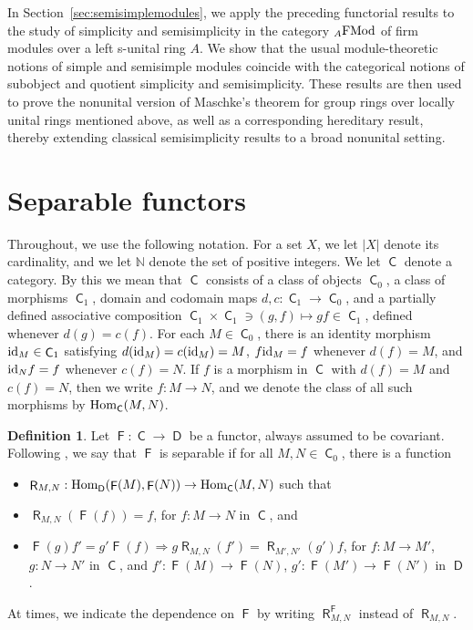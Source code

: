 \documentclass[12pt]{amsart}
\theoremstyle{definition}
\newtheorem{defi}[thm]{Definition}
\newcommand{\N}{\mathbb{N}}
\newcommand{\FMod}{{\rm FMod}}
\newcommand{\id}{{\rm id}}
\newcommand{\Hom}{{\rm Hom}}
\DeclareMathOperator{\C}{\mathsf C}
\DeclareMathOperator{\D}{\mathsf D}
\DeclareMathOperator{\F}{\mathsf F}
\DeclareMathOperator{\R}{\mathsf R}
\begin{document}
In Section~\ref{sec:semisimplemodules}, we apply the preceding functorial results to the study of simplicity and semisimplicity in the category ${}_A\FMod$ of firm modules over a left s-unital ring $A$. We show that the usual module-theoretic notions of simple and semisimple modules coincide with the categorical notions of subobject and quotient simplicity and semisimplicity. These results are then used to prove the nonunital version of Maschke’s theorem for group rings over locally unital rings mentioned above, as well as a corresponding hereditary result, thereby extending classical semisimplicity results to a broad nonunital setting.



\section{Separable functors}\label{sec:separablefunctors}



Throughout, we use the following notation. For a set $X$, we let $|X|$ denote its cardinality, and we let $\N$ denote the set of positive integers.
We let $\C$ denote a category. By this we mean that $\C$ consists of a class of objects $\C_0$, a class of morphisms $\C_1$, domain and codomain maps 
$d,c : \C_1 \to \C_0$, and a partially defined associative composition
$\C_1 \times \C_1 \ni (g,f) \mapsto gf \in \C_1$,
defined whenever $d(g)=c(f)$. For each $M \in \C_0$, there is an identity morphism $\id_M \in \C_1$ satisfying $d(\id_M)=c(\id_M)=M$, 
$f\id_M=f$ whenever $d(f)=M$, and 
$\id_N f=f$ whenever $c(f)=N$.
If $f$ is a morphism in $\C$ with $d(f)=M$ and $c(f)=N$, 
then we write $f:M\to N$, and we denote the class of all such morphisms by $\Hom_{\C}(M,N)$.

\begin{defi}\label{def:separablefunctor}
Let $\F : \C \to \D$ be a functor, 
always assumed to be covariant.
Following \cite{nastasescu1989}, 
we say that 
$\F$ is separable
if for all $M,N \in \C_0$, there is a 
function
\begin{itemize}[widest=(SF2)]

\item[(SF0)] 
$\R_{M,N} : \Hom_{\D}(\F(M),\F(N)) \to 
\Hom_{\C}(M,N)$ such that

\item[(SF1)] $\R_{M,N} ( \F(f) ) = f$, for
$f : M \to N$ in $\C$, and

\item[(SF2)] $\F(g) f' = g' \F(f) \Rightarrow
g \R_{M,N}(f') = \R_{M',N'}(g') f$,
for $f : M \to M'$, $g : N \to N'$ in $\C$, and
$f' : \F(M) \to \F(N)$, $g' : \F(M') \to \F(N')$ in $\D$.
\end{itemize}
At times, we indicate the dependence on $\F$ by 
writing $\R_{M,N}^{\F}$ instead of $\R_{M,N}$.
\end{defi} 
\end{document}
